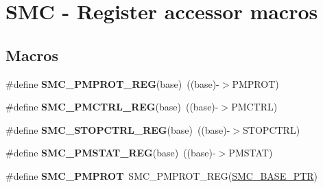 \hypertarget{group___s_m_c___register___accessor___macros}{}\section{S\+MC -\/ Register accessor macros}
\label{group___s_m_c___register___accessor___macros}
\subsection*{Macros}
\begin{DoxyCompactItemize}
\item 
\mbox{\label{group___s_m_c___register___accessor___macros_ga8faa7aff53d9f78046264ed895ba4bcc}} 
\#define {\bfseries S\+M\+C\+\_\+\+P\+M\+P\+R\+O\+T\+\_\+\+R\+EG}(base)~((base)-\/$>$P\+M\+P\+R\+OT)
\item 
\mbox{\label{group___s_m_c___register___accessor___macros_gaca57398aaa8f982675e83347cc971a66}} 
\#define {\bfseries S\+M\+C\+\_\+\+P\+M\+C\+T\+R\+L\+\_\+\+R\+EG}(base)~((base)-\/$>$P\+M\+C\+T\+RL)
\item 
\mbox{\label{group___s_m_c___register___accessor___macros_ga73be366508cb32f8bc1aad7ac106268c}} 
\#define {\bfseries S\+M\+C\+\_\+\+S\+T\+O\+P\+C\+T\+R\+L\+\_\+\+R\+EG}(base)~((base)-\/$>$S\+T\+O\+P\+C\+T\+RL)
\item 
\mbox{\label{group___s_m_c___register___accessor___macros_ga9d5f2b2a54cff2641473312ac780203e}} 
\#define {\bfseries S\+M\+C\+\_\+\+P\+M\+S\+T\+A\+T\+\_\+\+R\+EG}(base)~((base)-\/$>$P\+M\+S\+T\+AT)
\item 
\mbox{\label{group___s_m_c___register___accessor___macros_ga43f6628ef790c765722cee208c2c477d}} 
\#define {\bfseries S\+M\+C\+\_\+\+P\+M\+P\+R\+OT}~S\+M\+C\+\_\+\+P\+M\+P\+R\+O\+T\+\_\+\+R\+EG(\hyperlink{group___s_m_c___peripheral_ga31b6c4571795341e6446800243313e56}{S\+M\+C\+\_\+\+B\+A\+S\+E\+\_\+\+P\+TR})
\item 
\mbox{\label{group___s_m_c___register___accessor___macros_ga4b2bae0309aecee21e9fe70ac7dbe3dc}} 

\end{DoxyCompactItemize}
